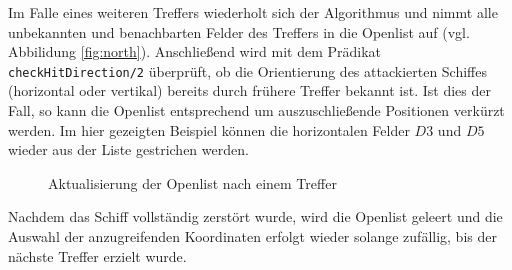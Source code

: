 Im Falle eines weiteren Treffers wiederholt sich der Algorithmus und nimmt alle unbekannten und benachbarten Felder des Treffers in die Openlist auf (vgl. Abbilidung \ref{fig:north}).
Anschließend wird mit dem Prädikat \texttt{checkHitDirection/2} überprüft, ob die Orientierung des attackierten Schiffes (horizontal oder vertikal) bereits durch frühere Treffer bekannt ist. 
Ist dies der Fall, so kann die Openlist entsprechend um auszuschließende Positionen verkürzt werden.
Im hier gezeigten Beispiel können die horizontalen Felder $D3$ und $D5$ wieder aus der Liste gestrichen werden.
\begin{figure}[H]
  \centering
  \caption{Aktualisierung der Openlist nach einem Treffer}
  \label{fig:Openlist3}
\end{figure}

Nachdem das Schiff vollständig zerstört wurde, wird die Openlist geleert und die Auswahl der anzugreifenden Koordinaten erfolgt wieder solange zufällig, bis der nächste Treffer erzielt wurde.